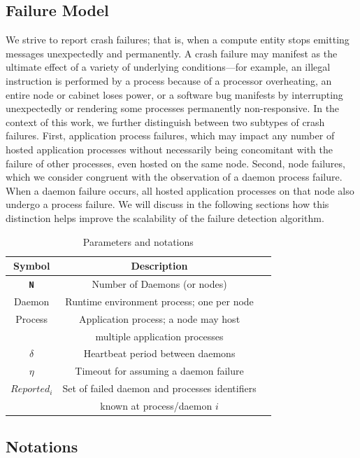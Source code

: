 \documentclass[sigconf]{acmart}
\begin{document}
\subsection{Failure Model}

We strive to report crash failures; that is, when a compute entity stops emitting
messages unexpectedly and permanently. A crash failure may manifest as
the ultimate effect of a variety of underlying conditions---for example, an illegal instruction
is performed by a process because of a processor overheating, an entire
node or cabinet loses power, or a software bug manifests by interrupting
unexpectedly or rendering some processes permanently non-responsive. In the context of
this work, we further distinguish between two subtypes of crash failures.
First, application process failures, which may impact any number of
hosted application processes without necessarily being concomitant
with the failure of other processes, even hosted on the same node.
Second, node failures, which we consider congruent with the observation of a daemon
process failure. When a daemon failure occurs, all hosted application processes on
that node also undergo a process failure. We will discuss in the following
sections how this distinction helps improve the scalability of the failure
detection algorithm.

\begin{table}
  \caption{Parameters and notations}\label{fig:notations}
  \label{tab:parameters}
  \small
  \begin{tabular}{ccl}
    \toprule
    Symbol & Description \\
    \midrule
    \texttt{\bf N} & Number of Daemons (or nodes) \\
    Daemon & Runtime environment process; one per node\\
    Process & Application process; a node may host \\& multiple application processes \\
    $\delta$ & Heartbeat period between daemons\\
    $\eta$ & Timeout for assuming a daemon failure\\
    $Reported_i$ & Set of failed daemon and processes identifiers\\
                 & known at process/daemon $i$ \\
    \bottomrule
  \end{tabular}
\end{table}

\subsection{Notations}
\end{document}
